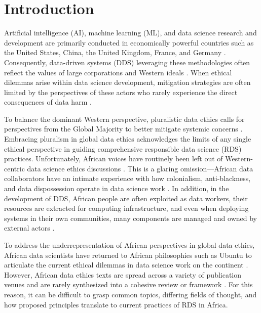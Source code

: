 \section{Introduction}
Artificial intelligence (AI), machine learning (ML), and data science research and development are primarily conducted in economically powerful countries such as the United States, China, the United Kingdom, France, and Germany \cite{bengio2024international}. 
Consequently, data-driven systems (DDS) leveraging these methodologies often reflect the values of large corporations and Western ideals \cite{birhane2022forgotten}. 
When ethical dilemmas arise within data science development, mitigation strategies are often limited by the perspectives of these actors who rarely experience the direct consequences of data harm \cite{mhlambi2023decolonizing,cisse2018look,gwagwa2022role}. 


To balance the dominant Western perspective, pluralistic data ethics calls for perspectives from the Global Majority to %
better mitigate systemic concerns \cite{rifat2023many,carman2023applying}. 
Embracing pluralism in global data ethics acknowledges the limits of any single ethical perspective in guiding comprehensive responsible data science (RDS) practices. 
Unfortunately, African voices have routinely been left out of Western-centric data science ethics discussions \cite{eke2023responsible}. 
This is a glaring omission---African data collaborators have an intimate experience with how colonialism, anti-blackness, and data dispossession operate in data science work \cite{abebe2021narratives,eke2023responsible}.
 In addition, in the development of DDS, African people are often exploited as data workers, their resources are extracted for computing infrastructure, and even when deploying systems in their own communities, many components are managed and owned by external actors \cite{birhane2020algorithmic}.

To address the underrepresentation of African perspectives in global data ethics, African data scientists have returned to African philosophies such as Ubuntu to articulate the current ethical dilemmas in data science work on the continent \cite{gwagwa2022role}. 
However, African data ethics texts are spread across a variety of publication venues and are %
rarely synthesized into a cohesive review or framework
\cite{eke2022responsible}. 
For this reason, it can be difficult to 
grasp
common topics, differing fields of thought, and how proposed principles translate to current practices of RDS in Africa. 

